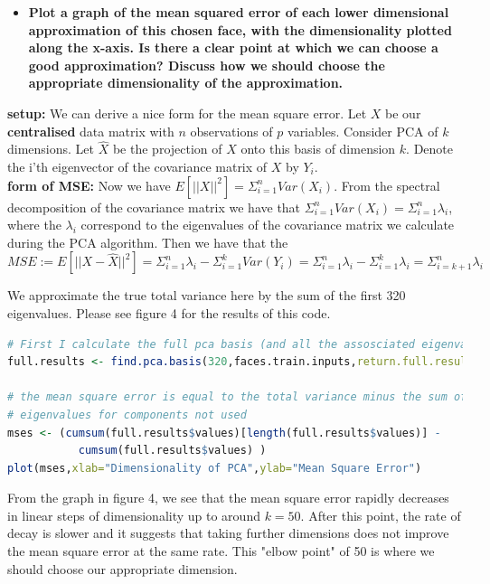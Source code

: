 \documentclass[12pt]{article}
\begin{document}
\begin{itemize}
\item \textbf{Plot a graph of the mean squared error of each lower dimensional approximation of this chosen face, with the dimensionality plotted along the x-axis. Is there a clear point at which we can choose a good approximation? Discuss how we should choose the appropriate dimensionality of the approximation.}
\end{itemize}
\textbf{setup:}
We can derive a nice form for the mean square error. Let $X$ be our \textbf{centralised} data matrix with $n$ observations of $p$ variables. Consider PCA of $k$ dimensions. Let $\hat{X}$ be the projection of $X$ onto this basis of dimension $k$. Denote the i'th eigenvector of the covariance matrix of $X$ by $Y_{i}$. \\
\textbf{form of MSE:}
Now we have $E[||X||^{2}] = \Sigma_{i=1}^{n} Var(X_{i})$. From the spectral decomposition of the covariance matrix we have that $\Sigma_{i=1}^{n} Var(X_{i}) = \Sigma_{i=1}^{n} \lambda_{i}$, where the $\lambda_{i}$ correspond to the eigenvalues of the covariance matrix we calculate during the PCA algorithm. Then we have that the $MSE := E[||X - \hat{X}  ||^{2}] = \Sigma_{i=1}^{n} \lambda_{i} - \Sigma_{i=1}^{k} Var(Y_{i}) =  \Sigma_{i=1}^{n} \lambda_{i} - \Sigma_{i=1}^{k} \lambda_{i} = \Sigma_{i=k+1}^{n} \lambda_{i}$

We approximate the true total variance here by the sum of the first 320 eigenvalues. Please see figure 4 for the results of this code. 

\begin{lstlisting}[linewidth=18.4cm,language=R]
# First I calculate the full pca basis (and all the assosciated eigenvalues)
full.results <- find.pca.basis(320,faces.train.inputs,return.full.results = TRUE)

# the mean square error is equal to the total variance minus the sum of the 
# eigenvalues for components not used 
mses <- (cumsum(full.results$values)[length(full.results$values)] - 
           cumsum(full.results$values) )
plot(mses,xlab="Dimensionality of PCA",ylab="Mean Square Error")
\end{lstlisting}


From the graph in figure 4, we see that the mean square error rapidly decreases in linear steps of dimensionality up to around $k = 50$. After this point, the rate of decay is slower and it suggests that taking further dimensions does not improve the mean square error at the same rate. This "elbow point" of 50 is where we should choose our appropriate dimension.
\end{document}
